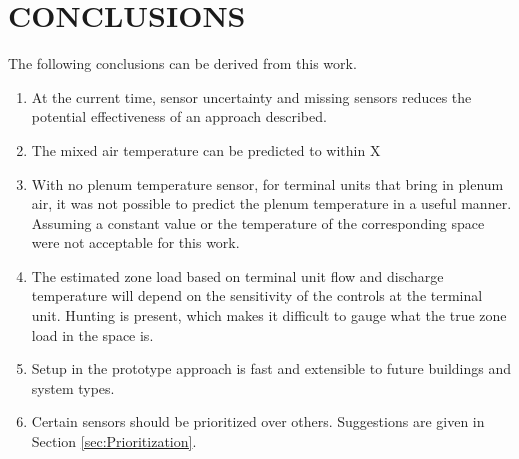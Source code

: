 \chapter{\uppercase{Conclusions}} 

The following conclusions can be derived from this work.

\begin{enumerate}
    \item At the current time, sensor uncertainty and missing sensors
        reduces the potential effectiveness of an approach described.
    \item The mixed air temperature can be predicted to within X
    \item With no plenum temperature sensor, for terminal units that
        bring in plenum air, it was not possible to predict the plenum
        temperature in a useful manner. Assuming a constant value or the
        temperature of the corresponding space were not acceptable for
        this work. 
    \item The estimated zone load based on terminal unit flow and
        discharge temperature will depend on the sensitivity of the
        controls at the terminal unit. Hunting is present, which makes
        it difficult to gauge what the true zone load in the space is. 
    \item Setup in the prototype approach is fast and extensible to
        future buildings and system types. 
    \item Certain sensors should be prioritized over others. Suggestions
        are given in Section \ref{sec:Prioritization}. 
\end{enumerate}
